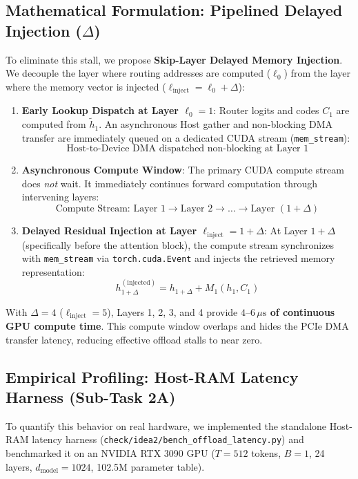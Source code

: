 \documentclass[11pt,a4paper]{article}
\begin{document}
\subsection{Mathematical Formulation: Pipelined Delayed Injection (\texorpdfstring{$\Delta$}{Delta})}
To eliminate this stall, we propose \textbf{Skip-Layer Delayed Memory Injection}. We decouple the layer where routing addresses are computed ($\ell_0$) from the layer where the memory vector is injected ($\ell_{\text{inject}} = \ell_0 + \Delta$):
\begin{enumerate}[leftmargin=1.4em, itemsep=2pt]
    \item \textbf{Early Lookup Dispatch at Layer $\ell_0 = 1$}: Router logits and codes $C_1$ are computed from $\tilde{h}_1$. An asynchronous Host gather and non-blocking DMA transfer are immediately queued on a dedicated CUDA stream (\texttt{mem\_stream}):
    \begin{equation}
    \text{Host-to-Device DMA dispatched non-blocking at Layer 1}
    \end{equation}
    \item \textbf{Asynchronous Compute Window}: The primary CUDA compute stream does \emph{not} wait. It immediately continues forward computation through intervening layers:
    \begin{equation}
    \text{Compute Stream: } \text{Layer } 1 \longrightarrow \text{Layer } 2 \longrightarrow \dots \longrightarrow \text{Layer } (1+\Delta)
    \end{equation}
    \item \textbf{Delayed Residual Injection at Layer $\ell_{\text{inject}} = 1 + \Delta$}: At Layer $1+\Delta$ (specifically before the attention block), the compute stream synchronizes with \texttt{mem\_stream} via \texttt{torch.cuda.Event} and injects the retrieved memory representation:
    \begin{equation}
    h_{1+\Delta}^{(\text{injected})} = h_{1+\Delta} + M_1(h_1, C_1)
    \end{equation}
\end{enumerate}

With $\Delta = 4$ ($\ell_{\text{inject}} = 5$), Layers 1, 2, 3, and 4 provide \textbf{$4\text{--}6\,\mu\text{s}$ of continuous GPU compute time}. This compute window overlaps and hides the PCIe DMA transfer latency, reducing effective offload stalls to near zero.

\subsection{Empirical Profiling: Host-RAM Latency Harness (Sub-Task 2A)}
To quantify this behavior on real hardware, we implemented the standalone Host-RAM latency harness (\texttt{check/idea2/bench\_offload\_latency.py}) and benchmarked it on an NVIDIA RTX 3090 GPU ($T = 512$ tokens, $B = 1$, 24 layers, $d_{\text{model}}=1024$, 102.5M parameter table).
\end{document}
